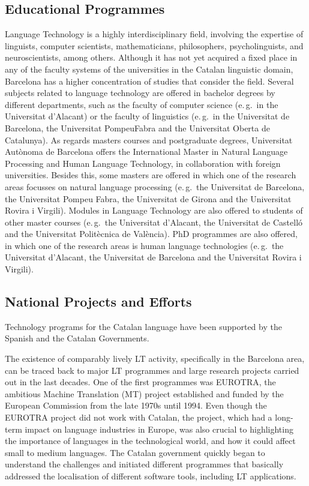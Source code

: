 \begin{multicols}{2}
\subsection{Educational Programmes}

Language Technology is a highly interdisciplinary field, involving the expertise of linguists, computer scientists, mathematicians, philosophers, psycholinguists, and neuroscientists, among others. Although it has not yet acquired a fixed place in any of the faculty systems of the universities in the Catalan linguistic domain, Barcelona has a higher concentration of studies that consider the field. 
Several subjects related to language technology are offered in bachelor degrees by different departments, such as the faculty of computer science (e.\,g.~in the Universitat d’Alacant) or the faculty of linguistics (e.\,g.~in the Universitat de Barcelona, the Universitat PompeuFabra and the Universitat Oberta de Catalunya).
As regards masters courses and postgraduate degrees, Universitat Autònoma de Barcelona offers the International Master in Natural Language Processing and Human Language Technology, in collaboration with foreign universities. Besides this, some masters are offered in which one of the research areas focusses on natural language processing (e.\,g.~the Universitat de Barcelona, the Universitat Pompeu Fabra, the Universitat de Girona and the Universitat Rovira i Virgili). Modules in Language Technology are also offered to students of other master courses (e.\,g.~the Universitat d’Alacant, the Universitat de Castelló and the Universitat Politècnica de València). 
PhD programmes are also offered, in which one of the research areas is human language technologies (e.\,g.~the Universitat d’Alacant, the Universitat de Barcelona and the Universitat Rovira i Virgili).

\subsection{National Projects and Efforts}

Technology programs for the Catalan language have been supported by the Spanish and the Catalan Governments.

The existence of comparably lively LT activity, specifically in the Barcelona area, can be traced back to major LT programmes and large research projects carried out in the last decades. One of the first programmes was EUROTRA, the ambitious Machine Translation (MT) project established and funded by the European Commission from the late 1970s until 1994. Even though the EUROTRA project did not work with Catalan, the project, which had a long-term impact on language industries in Europe, was also crucial to highlighting the importance of languages in the technological world, and how it could affect small to medium languages. The Catalan government quickly began to understand the challenges and initiated different programmes that basically addressed the localisation of different software tools, including LT applications. 


\end{multicols}
